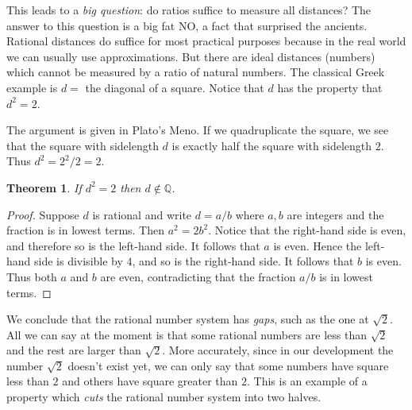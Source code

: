 \documentclass[11pt,oneside]{amsbook}
\newcommand{\Q}{\mathbb Q}
\theoremstyle{definition}
\theoremstyle{plain}
\newtheorem{thm}{Theorem}[section]
\theoremstyle{definition}
\theoremstyle{remark}
\numberwithin{equation}{section}
\numberwithin{figure}{section}
\begin{document}
This leads to a \emph{big question}: do ratios suffice to measure all distances? The answer to this question is a big fat NO, a fact that surprised the ancients. Rational distances do suffice for most practical purposes because in the real world we can usually use approximations. But there are ideal distances (numbers) which cannot be measured by a ratio of natural numbers. The classical Greek example is $d=$ the diagonal of a square. Notice that $d$ has the property that $d^2=2$.

\begin{center}
\quad
{}
\end{center}

The argument is given in Plato's Meno. If we quadruplicate the square, we see that the square with sidelength $d$ is exactly half the square with sidelength $2$. Thus $d^2=2^2/2=2$.

\begin{thm}
  \label{thm:root-2-irrational}
  If $d^2=2$ then $d\notin\Q$.
\end{thm}

\begin{proof}
  Suppose $d$ is rational and write $d=a/b$ where $a,b$ are integers and the fraction is in lowest terms. Then $a^2=2b^2$. Notice that the right-hand side is even, and therefore so is the left-hand side. It follows that $a$ is even. Hence the left-hand side is divisible by $4$, and so is the right-hand side. It follows that $b$ is even. Thus both $a$ and $b$ are even, contradicting that the fraction $a/b$ is in lowest terms.
\end{proof}

We conclude that the rational number system has \emph{gaps}, such as the one at $\sqrt2$. All we can say at the moment is that some rational numbers are less than $\sqrt2$ and the rest are larger than $\sqrt{2}$. More accurately, since in our development the number $\sqrt{2}$ doesn't exist yet, we can only say that some numbers have square less than $2$ and others have square greater than $2$. This is an example of a property which \emph{cuts} the rational number system into two halves.
\end{document}
